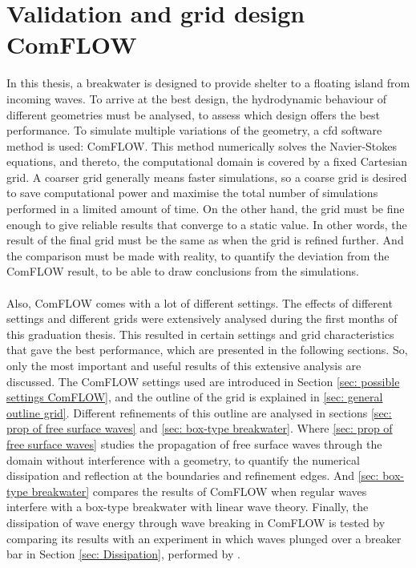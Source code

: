 \section{Validation and grid design ComFLOW}
\label{ch: validation comflow}
In this thesis, a breakwater is designed to provide shelter to a floating island from incoming waves. To arrive at the best design, the hydrodynamic behaviour of different geometries must be analysed, to assess which design offers the best performance. To simulate multiple variations of the geometry, a \acrshort{cfd} software method is used: ComFLOW. This method numerically solves the Navier-Stokes equations, and thereto, the computational domain is covered by a fixed Cartesian grid. A coarser grid generally means faster simulations, so a coarse grid is desired to save computational power and maximise the total number of simulations performed in a limited amount of time.  On the other hand, the grid must be fine enough to give reliable results that converge to a static value. In other words,  the result of the final grid must be the same as when the grid is refined further. And the comparison must be made with reality, to quantify the deviation from the ComFLOW result, to be able to draw conclusions from the simulations.\\
\\

Also, ComFLOW comes with a lot of different settings. The effects of different settings and different grids were extensively analysed during the first months of this graduation thesis. This resulted in certain settings and grid characteristics that gave the best performance, which are presented in the following sections. So, only the most important and useful results of this extensive analysis are discussed. The ComFLOW settings used are introduced in Section \ref{sec: possible settings ComFLOW}, and the outline of the grid is explained in \ref{sec: general outline grid}. Different refinements of this outline are analysed in sections \ref{sec: prop of free surface waves} and \ref{sec: box-type breakwater}. Where \ref{sec: prop of free surface waves} studies the propagation of free surface waves through the domain without interference with a geometry, to quantify the numerical dissipation and reflection at the boundaries and refinement edges. And \ref{sec: box-type breakwater} compares the results of ComFLOW when regular waves interfere with a box-type breakwater with linear wave theory. Finally, the dissipation of wave energy through wave breaking in ComFLOW is tested by comparing its results with an experiment in which waves plunged over a breaker bar in Section \ref{sec: Dissipation}, performed by \citet{breakerbarexperiment}.



